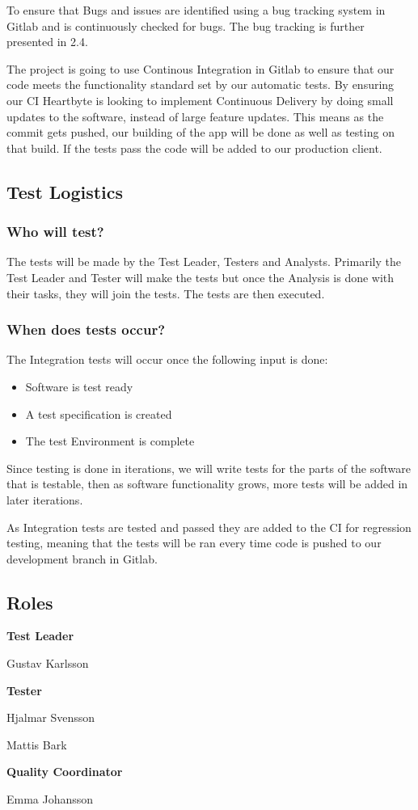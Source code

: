 To ensure that Bugs and issues are identified using a bug tracking system in Gitlab and is continuously checked for bugs. The bug tracking is further presented in 2.4.

The project is going to use Continous Integration in Gitlab to ensure that our code meets the functionality standard set by our automatic tests. By ensuring our CI Heartbyte is looking to implement Continuous Delivery by doing small updates to the software, instead of large feature updates. This means as the commit gets pushed, our building of the app will be done as well as testing on that build. If the tests pass the code will be added to our production client. 
\subsection{Test Logistics}
\subsubsection{Who will test?}
The tests will be made by the Test Leader, Testers and Analysts. Primarily the Test Leader and Tester will make the tests but once the Analysis is done with their tasks, they will join the tests. The tests are then executed.
\subsubsection{When does tests occur?}
The Integration tests will occur once the following input is done:
\begin{itemize}
    \item Software is test ready
    \item A test specification is created
    \item The test Environment is complete
\end{itemize}
Since testing is done in iterations, we will write tests for the parts of the software that is testable, then as software functionality grows, more tests will be added in later iterations.

As Integration tests are tested and passed they are added to the CI for regression testing, meaning that the tests will be ran every time code is pushed to our development branch in Gitlab.
\subsection{Roles}
\begin{flushleft}
   \textbf{Test Leader}
    
    
    Gustav Karlsson
  
   \textbf{Tester}
   
    Hjalmar Svensson
    
    Mattis Bark
   
   
   \textbf{Quality Coordinator}
   
    Emma Johansson
     

\end{flushleft}


\clearpage